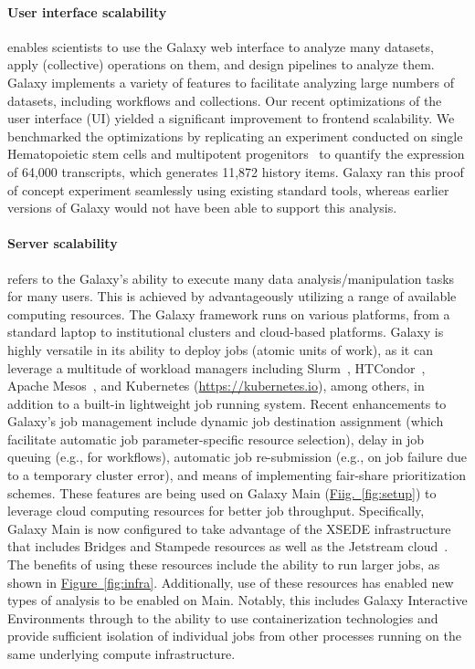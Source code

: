 \paragraph*{User interface scalability} enables scientists to use the Galaxy web interface to analyze many datasets, apply (collective) operations on them, and design pipelines to analyze them. Galaxy implements a variety of features to facilitate analyzing large numbers of datasets, including workflows and collections. Our recent optimizations of the user interface (UI) yielded a significant improvement to frontend scalability. We benchmarked the optimizations by replicating an experiment conducted on single Hematopoietic stem cells and multipotent progenitors~\cite{yang2016single} to quantify the expression of 64,000 transcripts, which generates 11,872 history items. Galaxy ran this proof of concept experiment seamlessly using existing standard tools, whereas earlier versions of Galaxy would not have been able to support this analysis.

\paragraph*{Server scalability} refers to the Galaxy’s ability to execute many data analysis/manipulation tasks for many users. This is achieved by advantageously utilizing a range of available computing resources. The Galaxy framework runs on various platforms, from a standard laptop to institutional clusters and cloud-based platforms. Galaxy is highly versatile in its ability to deploy jobs (atomic units of work), as it can leverage a multitude of workload managers including Slurm~\cite{yoo2003slurm}, HTCondor~\cite{thain2005distributed}, Apache Mesos~\cite{hindman2011mesos}, and Kubernetes (\url{https://kubernetes.io}), among others, in addition to a built-in lightweight job running system. Recent enhancements to Galaxy’s job management include dynamic job destination assignment (which facilitate automatic job parameter-specific resource selection), delay in job queuing (e.g., for workflows), automatic job re-submission (e.g., on job failure due to a temporary cluster error), and means of implementing fair-share prioritization schemes. These features are being used on Galaxy Main (\hyperref[fig:setup]{Fiig.~\ref{fig:setup}}) to leverage cloud computing resources for better job throughput. Specifically, Galaxy Main is now configured to take advantage of the XSEDE infrastructure~\cite{towns2014xsede} that includes Bridges and Stampede resources as well as the Jetstream cloud~\cite{stewart2015jetstream}. The benefits of using these resources include the ability to run larger jobs, as shown in \hyperref[fig:infra]{Figure~\ref{fig:infra}}. Additionally, use of these resources has enabled new types of analysis to be enabled on Main. Notably, this includes Galaxy Interactive Environments through to the ability to use containerization technologies and provide sufficient isolation of individual jobs from other processes running on the same underlying compute infrastructure.

